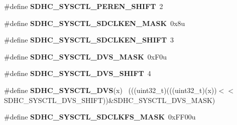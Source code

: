 \begin{DoxyCompactItemize}
\item 
\hypertarget{group___s_d_h_c___register___masks_ga28db53e7da45cb7a0ed9de6c7bac7a85}{}\#define {\bfseries S\+D\+H\+C\+\_\+\+S\+Y\+S\+C\+T\+L\+\_\+\+P\+E\+R\+E\+N\+\_\+\+S\+H\+I\+F\+T}~2\label{group___s_d_h_c___register___masks_ga28db53e7da45cb7a0ed9de6c7bac7a85}

\item 
\hypertarget{group___s_d_h_c___register___masks_ga19de408b244a32169fec30115c0b8a4a}{}\#define {\bfseries S\+D\+H\+C\+\_\+\+S\+Y\+S\+C\+T\+L\+\_\+\+S\+D\+C\+L\+K\+E\+N\+\_\+\+M\+A\+S\+K}~0x8u\label{group___s_d_h_c___register___masks_ga19de408b244a32169fec30115c0b8a4a}

\item 
\hypertarget{group___s_d_h_c___register___masks_ga4dbc0c5f5a10fdd6b7fb6642f10548df}{}\#define {\bfseries S\+D\+H\+C\+\_\+\+S\+Y\+S\+C\+T\+L\+\_\+\+S\+D\+C\+L\+K\+E\+N\+\_\+\+S\+H\+I\+F\+T}~3\label{group___s_d_h_c___register___masks_ga4dbc0c5f5a10fdd6b7fb6642f10548df}

\item 
\hypertarget{group___s_d_h_c___register___masks_ga8311f017ab13388163976f2e422d072d}{}\#define {\bfseries S\+D\+H\+C\+\_\+\+S\+Y\+S\+C\+T\+L\+\_\+\+D\+V\+S\+\_\+\+M\+A\+S\+K}~0x\+F0u\label{group___s_d_h_c___register___masks_ga8311f017ab13388163976f2e422d072d}

\item 
\hypertarget{group___s_d_h_c___register___masks_gafc17e8d8673044839bfc65d01ea0bc0b}{}\#define {\bfseries S\+D\+H\+C\+\_\+\+S\+Y\+S\+C\+T\+L\+\_\+\+D\+V\+S\+\_\+\+S\+H\+I\+F\+T}~4\label{group___s_d_h_c___register___masks_gafc17e8d8673044839bfc65d01ea0bc0b}

\item 
\hypertarget{group___s_d_h_c___register___masks_gaeeca8dd5539770bb8889af81539b60c8}{}\#define {\bfseries S\+D\+H\+C\+\_\+\+S\+Y\+S\+C\+T\+L\+\_\+\+D\+V\+S}(x)                                          ~(((uint32\+\_\+t)(((uint32\+\_\+t)(x))$<$$<$S\+D\+H\+C\+\_\+\+S\+Y\+S\+C\+T\+L\+\_\+\+D\+V\+S\+\_\+\+S\+H\+I\+F\+T))\&S\+D\+H\+C\+\_\+\+S\+Y\+S\+C\+T\+L\+\_\+\+D\+V\+S\+\_\+\+M\+A\+S\+K)\label{group___s_d_h_c___register___masks_gaeeca8dd5539770bb8889af81539b60c8}

\item 
\hypertarget{group___s_d_h_c___register___masks_gabfdc7b569ff6f7eb889833e218ac251f}{}\#define {\bfseries S\+D\+H\+C\+\_\+\+S\+Y\+S\+C\+T\+L\+\_\+\+S\+D\+C\+L\+K\+F\+S\+\_\+\+M\+A\+S\+K}~0x\+F\+F00u\label{group___s_d_h_c___register___masks_gabfdc7b569ff6f7eb889833e218ac251f}


\end{DoxyCompactItemize}
